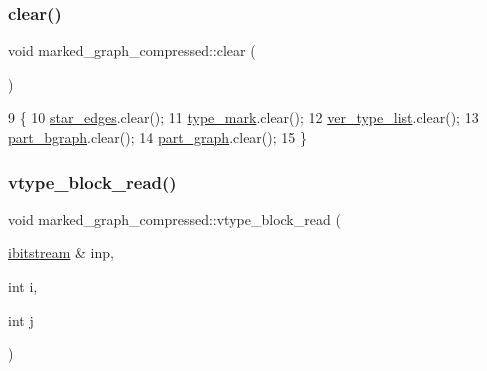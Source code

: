 \mbox{\label{classmarked__graph__compressed_af58307bfadcaa4c3ca6dd594c2f9b3a9}} 
\subsubsection{\texorpdfstring{clear()}{clear()}}
{\footnotesize\ttfamily void marked\+\_\+graph\+\_\+compressed\+::clear (\begin{DoxyParamCaption}{ }\end{DoxyParamCaption})}


\begin{DoxyCode}
9 \{
10   \hyperlink{classmarked__graph__compressed_a7df5779d313486644132bd816937f532}{star\_edges}.clear();
11   \hyperlink{classmarked__graph__compressed_a86b00223525703e973415cbc9c94da68}{type\_mark}.clear();
12   \hyperlink{classmarked__graph__compressed_af2e3e55223d436628a02758dfae88493}{ver\_type\_list}.clear();
13   \hyperlink{classmarked__graph__compressed_a7b3267063fba30b45eb21b3ba4e07536}{part\_bgraph}.clear();
14   \hyperlink{classmarked__graph__compressed_ae179a4737e6eab905c18a94d44ef64b7}{part\_graph}.clear();
15 \}
\end{DoxyCode}
\mbox{\label{classmarked__graph__compressed_a4bf8563a2dfd3038dc5833c014320487}} 
\subsubsection{\texorpdfstring{vtype\+\_\+block\+\_\+read()}{vtype\_block\_read()}\hspace{0.1cm}{\footnotesize\ttfamily [1/2]}}
{\footnotesize\ttfamily void marked\+\_\+graph\+\_\+compressed\+::vtype\+\_\+block\+\_\+read (\begin{DoxyParamCaption}\item[{\hyperlink{classibitstream}{ibitstream} \&}]{inp,  }\item[{int}]{i,  }\item[{int}]{j }\end{DoxyParamCaption})}

